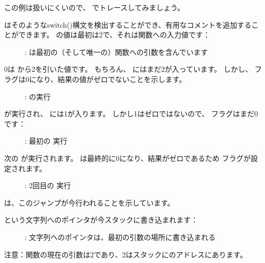 ﻿\clearpage
\mysubparagraph{\olly}

この例は扱いにくいので、 \olly でトレースしてみましょう。

\olly はそのようなswitch()構文を検出することができ、有用なコメントを追加することができます。
\EAX の値は最初は2で、それは関数への入力値です：

\begin{figure}[H]
\centering
{}
\caption{\olly: \EAX 
は最初の（そして唯一の）関数への引数を含んでいます}
\label{fig:switch_few_olly1}
\end{figure}

\clearpage
0は \EAX から2を引いた値です。
もちろん、 \EAX にはまだ2が入っています。
しかし、 \ZF フラグは0になり、結果の値がゼロでないことを示します。

\begin{figure}[H]
\centering
{}
\caption{\olly: \SUB の実行}
\label{fig:switch_few_olly2}
\end{figure}

\clearpage
\DEC が実行され、 \EAX には1が入ります。
しかし1はゼロではないので、 \ZF フラグはまだ0です：

\begin{figure}[H]
\centering
{}
\caption{\olly: 最初の \DEC 実行}
\label{fig:switch_few_olly3}
\end{figure}

\clearpage
次の \DEC が実行されます。
\EAX は最終的に0になり、結果がゼロであるため \ZF フラグが設定されます。

\begin{figure}[H]
\centering
{}
\caption{\olly: 2回目の \DEC 実行}
\label{fig:switch_few_olly4}
\end{figure}

\olly は、このジャンプが今行われることを示しています。

\clearpage
{}という文字列へのポインタが今スタックに書き込まれます：

\begin{figure}[H]
\centering
{}
\caption{\olly: 
文字列へのポインタは、最初の引数の場所に書き込まれる}
\label{fig:switch_few_olly5}
\end{figure}

注意：関数の現在の引数は2であり、2はスタックにのアドレスにあります。

